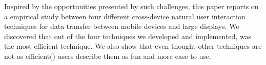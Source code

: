 Inspired by the opportunities presented by such challenges, this paper reports on a empirical study between four different cross-device natural user interaction techniques for data transfer between mobile devices and large displays.
We discovered that out of the four techniques we developed and implemented, \swipe was the most efficient technique. We also show that even thought other techniques are not as efficient(\pinch) users describe them as fun and more ease to use. 
